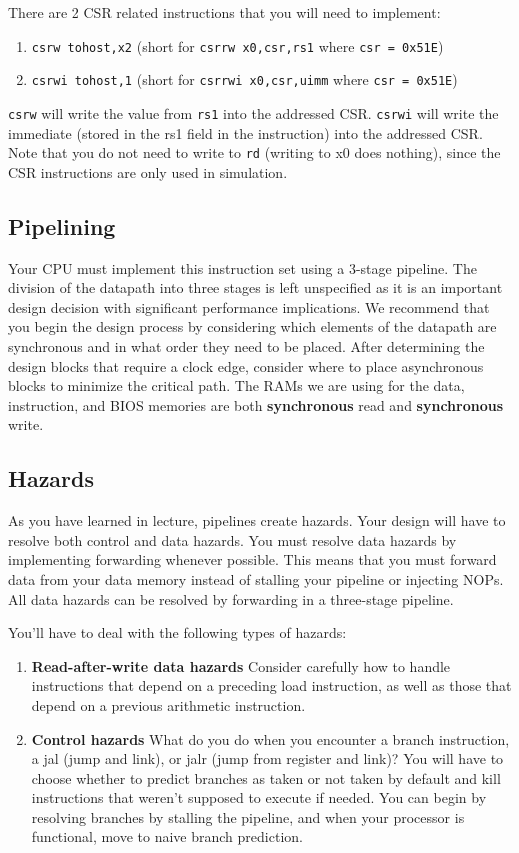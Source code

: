 \documentclass[11pt]{article}
\begin{document}
There are 2 CSR related instructions that you will need to implement:
\begin{enumerate}
  \item \texttt{csrw tohost,x2}  (short for \texttt{csrrw x0,csr,rs1} where \texttt{csr = 0x51E})
  \item \texttt{csrwi tohost,1}  (short for \texttt{csrrwi x0,csr,uimm} where \texttt{csr = 0x51E})
\end{enumerate}

\texttt{csrw} will write the value from \texttt{rs1} into the addressed CSR.
\texttt{csrwi} will write the immediate (stored in the rs1 field in the instruction) into the addressed CSR.
Note that you do not need to write to \texttt{rd} (writing to x0 does nothing), since the CSR instructions are only used in simulation.



\subsection{Pipelining}
Your CPU must implement this instruction set using a 3-stage pipeline.
The division of the datapath into three stages is left unspecified as it is an important design decision with significant performance implications.
We recommend that you begin the design process by considering which elements of the datapath are synchronous and in what order they need to be placed.
After determining the design blocks that require a clock edge, consider where to place asynchronous blocks to minimize the critical path.
The RAMs we are using for the data, instruction, and BIOS memories are both \textbf{synchronous} read and \textbf{synchronous} write.

\subsection{Hazards}
As you have learned in lecture, pipelines create hazards.
Your design will have to resolve both control and data hazards.
You must resolve data hazards by implementing forwarding whenever possible.
This means that you must forward data from your data memory instead of stalling your pipeline or injecting NOPs.
All data hazards can be resolved by forwarding in a three-stage pipeline.

You'll have to deal with the following types of hazards:
\begin{enumerate}
  \item \textbf{Read-after-write data hazards} Consider carefully how to handle instructions that depend on a preceding load instruction, as well as those that depend on a previous arithmetic instruction.
  \item \textbf{Control hazards} What do you do when you encounter a branch instruction, a jal (jump and link), or jalr (jump from register and link)?
    You will have to choose whether to predict branches as taken or not taken by default and kill instructions that weren't supposed to execute if needed.
    You can begin by resolving branches by stalling the pipeline, and when your processor is functional, move to naive branch prediction.
\end{enumerate}
\end{document}

